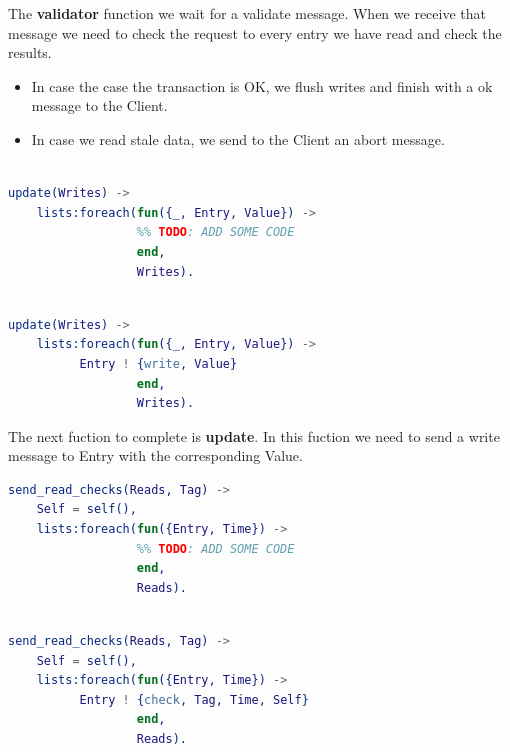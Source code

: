 \documentclass[a4paper, 10pt]{article}
\begin{document}
The \textbf{validator} function we wait for a validate message. When we receive that message we need to check the request to every entry we have read and check the results.

\begin{itemize}
  \item In case the case the transaction is OK, we flush writes and finish with a ok message to the Client.
  \item In case we read stale data, we send to the Client an abort message.
\end{itemize}

\begin{minipage}{.45\textwidth}
	\begin{lstlisting}[language=erlang, caption={Template}]

update(Writes) ->
    lists:foreach(fun({_, Entry, Value}) -> 
                  %% TODO: ADD SOME CODE
                  end, 
                  Writes).
 	\end{lstlisting}
    \end{minipage}\hfill
    \begin{minipage}{.45\textwidth}
	\begin{lstlisting}[language=erlang, caption={Filled version}]

update(Writes) ->
    lists:foreach(fun({_, Entry, Value}) -> 
		  Entry ! {write, Value}
                  end, 
                  Writes).
  	\end{lstlisting}
  \end{minipage}


  The next fuction to complete is \textbf{update}. In this fuction we need to send a write message to Entry with the corresponding Value.


\begin{minipage}{.45\textwidth}
	\begin{lstlisting}[language=erlang, caption={Template}]
send_read_checks(Reads, Tag) ->
    Self = self(),
    lists:foreach(fun({Entry, Time}) -> 
                  %% TODO: ADD SOME CODE
                  end, 
                  Reads).
 	\end{lstlisting}
    \end{minipage}\hfill
    \begin{minipage}{.45\textwidth}
	\begin{lstlisting}[language=erlang, caption={Filled version}]

send_read_checks(Reads, Tag) ->
    Self = self(),
    lists:foreach(fun({Entry, Time}) -> 
		  Entry ! {check, Tag, Time, Self}
                  end, 
                  Reads).
  	\end{lstlisting}
  \end{minipage}
\end{document}
